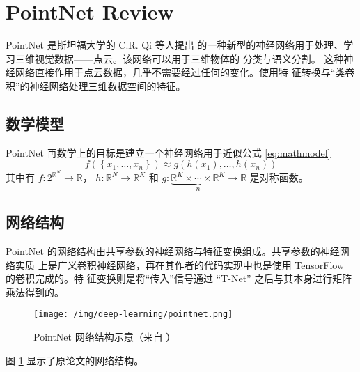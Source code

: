 \section{PointNet Review}

PointNet \cite{DBLP:journals/corr/QiSMG16} 是斯坦福大学的 C.R. Qi 等人提出
的一种新型的神经网络用于处理、学习三维视觉数据——点云。该网络可以用于三维物体的
分类与语义分割。 这种神经网络直接作用于点云数据，几乎不需要经过任何的变化。使用特
征转换与“类卷积”的神经网络处理三维数据空间的特征。

\subsection{数学模型}
  
PointNet 再数学上的目标是建立一个神经网络用于近似公式 \eqref{eq:mathmodel}
\begin{equation}
  \label{eq:mathmodel}
  f\left( \left\{ x_1,\dots, x_n \right\} \right) \approx g\left( h(x_1),\dots, h(x_n) \right)
\end{equation}
其中有 $f : 2^{\mathbb{R}^N} \rightarrow \mathbb{R}$， $h : \mathbb{R}^N
\rightarrow \mathbb{R}^K$ 和 $g :  \underbrace{\mathbb{R}^K \times \cdots \times
  \mathbb{R}^K}_{n} \rightarrow \mathbb{R}$ 是对称函数。


\subsection{网络结构}

PointNet 的网络结构由共享参数的神经网络与特征变换组成。共享参数的神经网络实质
上是广义卷积神经网络，再在其作者的代码实现中也是使用 TensorFlow 的卷积完成的。特
征变换则是将“传入”信号通过 “T-Net” 之后与其本身进行矩阵乘法得到的。

\begin{figure}
  \centering
  \texttt{[image: /img/deep-learning/pointnet.png]}
  \caption{PointNet 网络结构示意（来自 \cite{DBLP:journals/corr/QiSMG16}）}
  \label{fig:pointnet-arch}
\end{figure}

图 \ref{fig:pointnet-arch} 显示了原论文的网络结构。